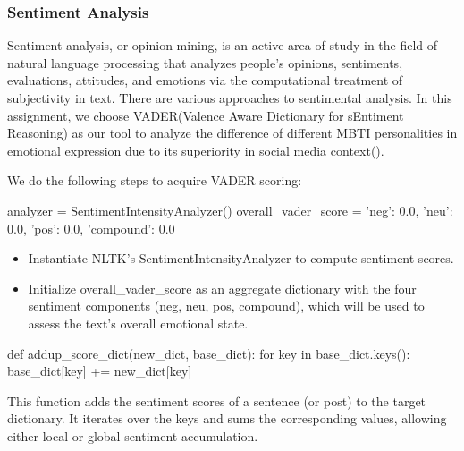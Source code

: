 \documentclass[12pt]{article}
\begin{document}
	
	
	
	\subsubsection{Sentiment Analysis}
	Sentiment analysis, or opinion mining, is an active area of study in the field of natural language processing that analyzes people's opinions, sentiments, evaluations, attitudes, and emotions via the computational treatment of subjectivity in text. There are various approaches to sentimental analysis. In this assignment, we choose VADER(Valence Aware Dictionary for sEntiment Reasoning) as our tool to analyze the difference of different MBTI personalities in emotional expression due to its superiority in social media context(\cite{VADER}).
	
	
	We do the following steps to acquire VADER scoring:

	 \begin{python}
analyzer = SentimentIntensityAnalyzer()
overall_vader_score = {'neg': 0.0, 'neu': 0.0, 'pos': 0.0, 'compound': 0.0}
	\end{python}
	\begin{itemize}
	\item Instantiate NLTK’s SentimentIntensityAnalyzer to compute sentiment scores.
	\item Initialize overall\_vader\_score as an aggregate dictionary with the four sentiment components (neg, neu, pos, compound), which will be used to assess the text’s overall emotional state.

	\end{itemize}

	\begin{python}
def addup_score_dict(new_dict, base_dict):
    for key in base_dict.keys():
        base_dict[key] += new_dict[key]
	\end{python}
	This function adds the sentiment scores of a sentence (or post) to the target dictionary. It iterates over the keys and sums the corresponding values, allowing either local or global sentiment accumulation.
\end{document}
